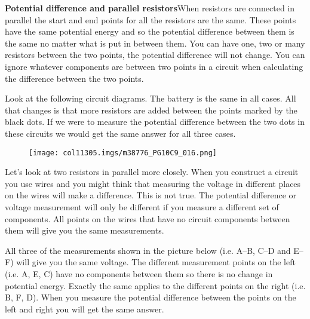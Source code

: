           \par 
        \label{m38776*id64009}\noindent{}\textbf{Potential difference and parallel resistors}When resistors are connected in parallel the start and end points for all the resistors are the same. These points have the same potential energy and so the potential difference between them is the same no matter what is put in between them. You can have one, two or many resistors between the two points, the potential difference will not change. You can ignore whatever components are between two points in a circuit when calculating the difference between the two points.\par 
        \label{m38776*id64017}Look at the following circuit diagrams. The battery is the same in all cases. All that changes is that more resistors are added between the points marked by the black dots. If we were to measure the potential difference between the two dots in these circuits we would get the same answer for all three cases.\par 
        \label{m38776*id64023}
    \setcounter{subfigure}{0}
	\begin{figure}[H] %
    \begin{center}
    \label{m38776*id64026!!!underscore!!!media}\label{m38776*id64026!!!underscore!!!printimage}\texttt{[image: col11305.imgs/m38776\_PG10C9\_016.png]} %
      \vspace{2pt}
    \vspace{.1in}
    \end{center}
 \end{figure}       
        \par 
        \label{m38776*id64033}Let's look at two resistors in parallel more closely. When you construct a circuit you use wires and you might think that measuring the voltage in different places on the wires will make a difference. This is not true. The potential difference or voltage measurement will only be different if you measure a different set of components. All points on the wires that have no circuit components between them will give you the same measurements.\par 
        \label{m38776*id64040}All three of the measurements shown in the picture below (i.e. A--B, C--D and E--F) will give you the same voltage. The different measurement points on the left (i.e. A, E, C) have no components between them so there is no change in potential energy.
Exactly the same applies to the different points on the right (i.e. B, F, D). When you measure the potential difference between the points on the left and right you will get the same answer.\par 
